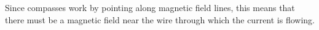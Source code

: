 

Since compasses work by pointing along magnetic field lines, this means that there must be a magnetic field near the wire through which the current is flowing.




